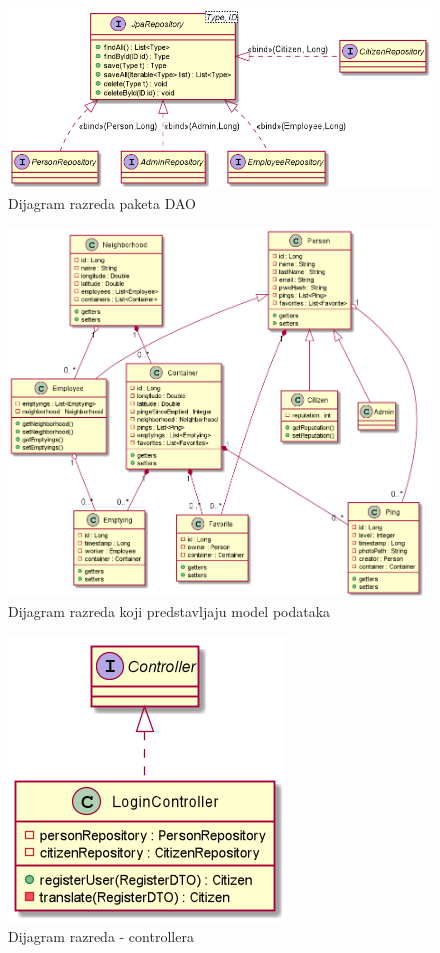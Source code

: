 			\begin{figure}[H]
				\includegraphics[scale=0.5]{figures/DAOClassDiagram.PNG}
				\centering
				\caption{Dijagram razreda paketa DAO}
				\label{fig:dao-cd}
			\end{figure}
		
			\begin{figure}[H]
				\includegraphics[scale=0.5]{figures/ModelClassDiagram.PNG}
				\centering
				\caption{Dijagram razreda koji predstavljaju model podataka}
				\label{fig:model-cd}
			\end{figure}
		
			\begin{figure}[H]
				\includegraphics[scale=0.8]{figures/ControllerClassDiagram.PNG}
				\centering
				\caption{Dijagram razreda - controllera}
				\label{fig:controller-cd}
			\end{figure}
			
